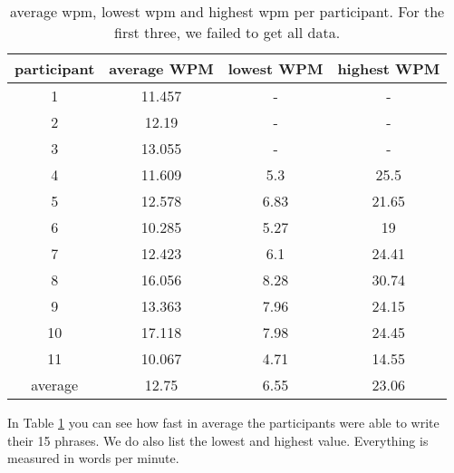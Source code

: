 \begin{table}[ht!]
    \centering
    \caption{average wpm, lowest wpm and highest wpm per participant. For the first three, we failed to get all data.}
    \begin{tabular}{cccc} \toprule
        participant&average WPM&lowest WPM&highest WPM\\ \midrule
        1 & 11.457 & - & -\\ 
        2 & 12.19 & - & -\\
        3 & 13.055 & - & -\\ 
        4 & 11.609 & 5.3 & 25.5\\
        5 & 12.578 & 6.83 & 21.65\\
        6 & 10.285 & 5.27 & 19\\
        7 & 12.423 & 6.1 & 24.41\\
        8 & 16.056 & 8.28 & 30.74\\
        9 & 13.363 & 7.96 & 24.15\\
        10 & 17.118 & 7.98 & 24.45\\
        11 & 10.067 & 4.71 & 14.55\\
        \bottomrule
        average&12.75&6.55&23.06\\
        \bottomrule
    \end{tabular}
    \label{tab:WPM}
\end{table}

In Table \ref{tab:WPM} you can see how fast in average the participants were able to write their 15 phrases. We do also list the lowest and highest value. Everything is measured in words per minute. 

